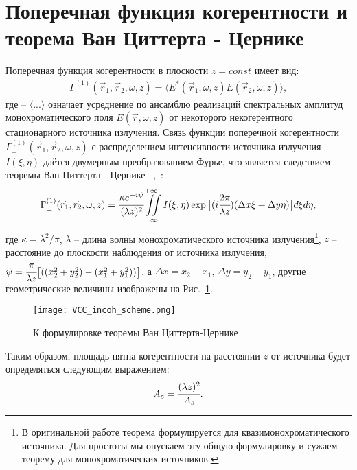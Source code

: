 \section{Поперечная функция когерентности и теорема Ван Циттерта - Цернике}
Поперечная функция когерентности в плоскости $z = const$ имеет вид:
\begin{align}
	\Gamma^{(1)}_{\perp} (\vec{r}_1, \vec{r}_2, \omega, z) = \big \langle {E}^*(\vec{r}_1, \omega, z) {E}(\vec{r}_2, \omega, z) \big \rangle,
	\label{eq:g1} 
\end{align}
где -- $\big \langle ... \big \rangle$ означает усреднение по ансамблю реализаций спектральных амплитуд монохроматического поля $\bar{E}(\vec{r}, \omega, z)$ от некоторого некогерентного стационарного источника излучения. Связь функции поперечной когерентности $\Gamma^{(1)}_{\perp} (\vec{r}_1, \vec{r}_2, \omega, z)$ с распределением интенсивности источника излучения $I(\xi, \eta)$ даётся двумерным преобразованием Фурье, что является следствием теоремы Ван Циттерта - Цернике ~\cite{van_cittert_wahrscheinliche_1934},~\cite{zernike_concept_1938}:
\begin{align}
	\Gamma^{(1)}_{\perp} (\vec{r}_1, \vec{r}_2, \omega, z) = \cfrac{\kappa e^{-i\psi}}{({\lambda}z)^2} \iint \limits_{-\infty}^{+\infty} I(\xi, \eta) \exp{\big [(i \cfrac{2 \pi}{{\lambda}z}) (\Delta x \xi + \Delta y \eta)\big]}d\xi d\eta, 
	\label{eq:van_cittert_zernike_theorem} 
\end{align}
где $\kappa = {\lambda}^2 / \pi$, ${\lambda}$ -- длина волны монохроматического источника излучения\footnote{В оригинальной работе теорема формулируется для квазимонохроматического источника. Для простоты мы опускаем эту общую формулировку и сужаем теорему для монохроматических источников.}, $z$ -- расстояние до плоскости наблюдения от источника излучения, $\psi = \cfrac{\pi}{{\lambda} z}\big[((x^2_2 + y^2_2) - (x^2_1 + y^2_1)) \big]$, а $\Delta x = x_2 - x_1$, $\Delta y = y_2 - y_1$, другие геометрические величины изображены на Рис.~\ref{fig:VCC_scheme_incoh}.
\begin{figure}[H] 
	\centering 	\texttt{[image: VCC\_incoh\_scheme.png]}
	\caption{К формулировке теоремы Ван Циттерта-Цернике}
	\label{fig:VCC_scheme_incoh}
\end{figure}
Таким образом, площадь пятна когерентности на расстоянии $z$ от источника будет определяться следующим выражением:
\begin{align}
	A_c = \cfrac{({\lambda} z)^2}{A_s}.
	\label{eq:VCC}
\end{align}

